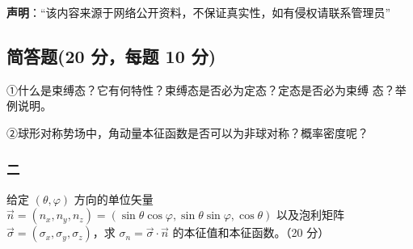 
\textbf{声明}：“该内容来源于网络公开资料，不保证真实性，如有侵权请联系管理员”

\subsection{简答题(20 分，每题 10 分)}
①什么是束缚态？它有何特性？束缚态是否必为定态？定态是否必为束缚
态？举例说明。

②球形对称势场中，角动量本征函数是否可以为非球对称？概率密度呢？

\subsubsection{二}
 给定 $\left( \theta, \varphi \right)$ 方向的单位矢量 $\vec{n} = \left( n_x, n_y, n_z \right) = \left( \sin \theta \cos \varphi, \sin \theta \sin \varphi, \cos \theta \right)$ 以及泡利矩阵 $\vec{\sigma} = \left( \sigma_x, \sigma_y, \sigma_z \right)$，求 $\sigma_n = \vec{\sigma} \cdot \vec{n}$ 的本征值和本征函数。（20 分）

